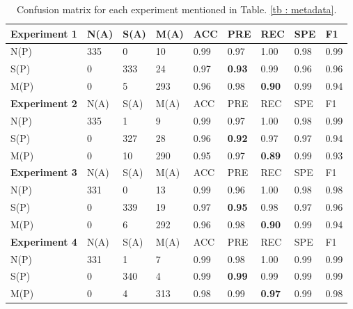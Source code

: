 \begin{table}
    \caption{
        Confusion matrix for each experiment mentioned in Table. \ref{tb :
        metadata}.
    }

    \label{tb : real performance}

        \begin{tabularx}{\linewidth}{ l | X X X X X X X X }
            \textbf{Experiment 1} &  N(A) & S(A) & M(A) & ACC  & PRE  & REC           & SPE  & F1   \\
            \hline
            N(P)                  &  335  & 0    & 10   & 0.99 & 0.97 & 1.00          & 0.98 & 0.99 \\
            S(P)                  &  0    & 333  & 24   & 0.97 & \textbf{0.93} & 0.99          & 0.96 & 0.96 \\
            M(P)                  &  0    & 5    & 293  & 0.96 & 0.98 & \textbf{0.90} & 0.99 & 0.94 \\
            \hline
            \textbf{Experiment 2} &  N(A) & S(A)  & M(A) & ACC  & PRE  & REC           & SPE  & F1   \\
            \hline
            N(P)                  &  335  & 1     & 9    & 0.99 & 0.97 & 1.00          & 0.98 & 0.99 \\
            S(P)                  &  0    & 327   & 28   & 0.96 & \textbf{0.92} & 0.97          & 0.97 & 0.94 \\
            M(P)                  &  0    & 10    & 290  & 0.95 & 0.97 & \textbf{0.89} & 0.99 & 0.93 \\
            \hline
            \textbf{Experiment 3} &  N(A) & S(A)   & M(A) & ACC  & PRE  & REC           & SPE  & F1   \\
            \hline
            N(P)                  &  331  & 0      & 13   & 0.99 & 0.96 & 1.00          & 0.98 & 0.98 \\
            S(P)                  &  0    & 339    & 19   & 0.97 & \textbf{0.95} & 0.98          & 0.97 & 0.96 \\
            M(P)                  &  0    & 6      & 292  & 0.96 & 0.98 & \textbf{0.90} & 0.99 & 0.94 \\
            \hline
            \textbf{Experiment 4} &  N(A) & S(A)   & M(A) & ACC  & PRE  & REC           & SPE  & F1   \\
            \hline
            N(P)                  &  331  & 1      & 7    & 0.99 & 0.98 & 1.00          & 0.99 & 0.99 \\
            S(P)                  &  0    & 340    & 4    & 0.99 & \textbf{0.99} & 0.99          & 0.99 & 0.99 \\
            M(P)                  &  0    & 4      & 313  & 0.98 & 0.99 & \textbf{0.97} & 0.99 & 0.98 \\
        \end{tabularx}
\end{table}


